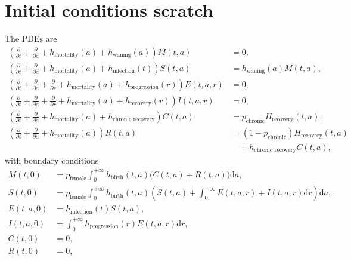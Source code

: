 \documentclass[12pt]{article}
\newcommand{\md}{\mathrm{d}}
\begin{document}
\section{Initial conditions scratch}

The PDEs are
\begin{equation}
  \begin{split}
    \left(
      \frac{\partial}{\partial t}
      + \frac{\partial}{\partial a}
      + h_{\text{mortality}}(a)
      + h_{\text{waning}}(a)
    \right) M(t, a)
    &= 0,
    \\
    \left(
      \frac{\partial}{\partial t}
      + \frac{\partial}{\partial a}
      + h_{\text{mortality}}(a)
      + h_{\text{infection}}(t)
    \right) S(t, a)
    &= h_{\text{waning}}(a) M(t, a),
    \\
    \left(
      \frac{\partial}{\partial t}
      + \frac{\partial}{\partial a}
      + \frac{\partial}{\partial r}
      + h_{\text{mortality}}(a)
      + h_{\text{progression}}(r)
    \right) E(t, a, r)
    &= 0,
    \\
    \left(
      \frac{\partial}{\partial t}
      + \frac{\partial}{\partial a}
      + \frac{\partial}{\partial r}
      + h_{\text{mortality}}(a)
      + h_{\text{recovery}}(r)
    \right) I(t, a, r)
    &= 0,
    \\
    \left(
      \frac{\partial}{\partial t}
      + \frac{\partial}{\partial a}
      + h_{\text{mortality}}(a)
      + h_{\text{chronic recovery}}
    \right) C(t, a)
    &= p_{\text{chronic}} H_{\text{recovery}}(t, a),
    \\
    \left(
      \frac{\partial}{\partial t}
      + \frac{\partial}{\partial a}
      + h_{\text{mortality}}(a)
    \right) R(t, a)
    &= (1 - p_{\text{chronic}}) H_{\text{recovery}}(t, a)
    \\ & \quad {}
    + h_{\text{chronic recovery}} C(t, a),
  \end{split}
\end{equation}
with boundary conditions
\begin{equation}
  \begin{split}
    M(t, 0)
    &= p_{\text{female}}
    \int_0^{+\infty} h_{\text{birth}}(t, a)
    \big(C(t, a) + R(t, a)\big) \md a,
    \\
    S(t, 0)
    &= p_{\text{female}}
    \int_0^{+\infty} h_{\text{birth}}(t, a)
    \left(S(t, a) +
    \int_0^{+\infty} E(t, a, r) + I(t, a, r) \md r\right) \md a,
    \\
    E(t, a, 0)
    &= h_{\text{infection}}(t) S(t, a),
    \\
    I(t, a, 0)
    &= \int_0^{+\infty}h_{\text{progression}}(r) E(t, a, r) \md r,
    \\
    C(t, 0) &= 0,
    \\
    R(t, 0) &= 0,
  \end{split}
\end{equation}
\end{document}
